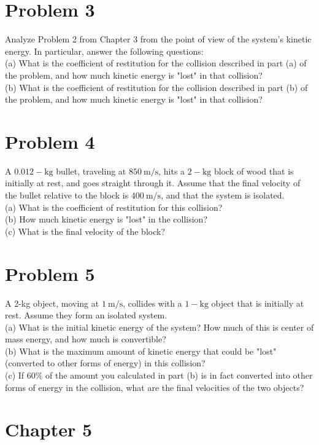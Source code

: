 \documentclass[10pt]{article}
\begin{document}
\section*{Problem 3}
Analyze Problem 2 from Chapter 3 from the point of view of the system's kinetic energy. In particular, answer the following questions:\\
(a) What is the coefficient of restitution for the collision described in part (a) of the problem, and how much kinetic energy is "lost" in that collision?\\
(b) What is the coefficient of restitution for the collision described in part (b) of the problem, and how much kinetic energy is "lost" in that collision?

\section*{Problem 4}
A $0.012-\mathrm{kg}$ bullet, traveling at $850 \mathrm{~m} / \mathrm{s}$, hits a $2-\mathrm{kg}$ block of wood that is initially at rest, and goes straight through it. Assume that the final velocity of the bullet relative to the block is $400 \mathrm{~m} / \mathrm{s}$, and that the system is isolated.\\
(a) What is the coefficient of restitution for this collision?\\
(b) How much kinetic energy is "lost" in the collision?\\
(c) What is the final velocity of the block?

\section*{Problem 5}
A 2-kg object, moving at $1 \mathrm{~m} / \mathrm{s}$, collides with a $1-\mathrm{kg}$ object that is initially at rest. Assume they form an isolated system.\\
(a) What is the initial kinetic energy of the system? How much of this is center of mass energy, and how much is convertible?\\
(b) What is the maximum amount of kinetic energy that could be "lost" (converted to other forms of energy) in this collision?\\
(c) If $60 \%$ of the amount you calculated in part (b) is in fact converted into other forms of energy in the collision, what are the final velocities of the two objects?

\section*{Chapter 5}
\end{document}
